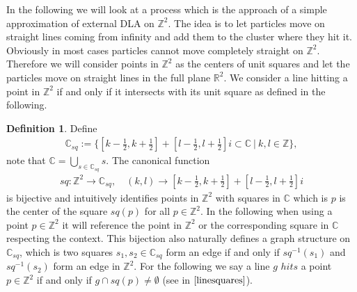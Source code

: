 \documentclass[12pt,a4paper]{scrartcl}
\numberwithin{equation}{subsection}
\newcommand{\C}{\mathbb{C}} %
\newcommand{\1}{\mathbbm{1}}
\numberwithin{equation}{section}
\theoremstyle{definition}
\newtheorem{definition}{Definition}[subsection]
\begin{document}
In the following we will look at a process which is the approach of a simple approximation of external DLA on $\mathbb{Z}^2$. The idea is to let particles move on straight lines coming from infinity and add them to the cluster where they hit it. Obviously in most cases particles cannot move completely straight on $\mathbb{Z}^2$. Therefore we will consider points in $\mathbb{Z}^2$ as the centers of unit squares and let the particles move on straight lines in the full plane $\mathbb{R}^2$. We consider a line hitting a point in $\mathbb{Z}^2$ if and only if it intersects with its unit square as defined in the following. 

\begin{definition} \label{squares}
	Define 
	\begin{align}
		\C_{sq} := \{[k - \frac{1}{2}, k + \frac{1}{2}] + [l- \frac{1}{2}, l + \frac{1}{2}]i \subset \C\ |\ k,l \in \mathbb{Z}\}, 
	\end{align} 
	note that $\C = \bigcup_{s\in \C_{sq}} s$. The canonical function
	\begin{align}
	sq: \mathbb{Z}^2 \to \C_{sq},\quad (k,l)\to [k - \frac{1}{2}, k + \frac{1}{2}] + [l- \frac{1}{2}, l + \frac{1}{2}]i
	\end{align}
	is bijective and intuitively identifies points in $\mathbb{Z}^2$ with squares in $\C$ which is $p$ is the center of the square $sq(p)$ for all $p\in \mathbb{Z}^2$. In the following when using a point $p\in \mathbb{Z}^2$ it will reference the point in $\mathbb{Z}^2$ or the corresponding square in $\C$ respecting the context. This bijection also naturally defines a graph structure on $\C_{sq}$, which is two squares $s_1, s_2\in \C_{sq}$ form an edge if and only if $sq^{-1}(s_1)$ and $sq^{-1}(s_2)$ form an edge in $\mathbb{Z}^2$. 
	\noindent For the following we say a line $g$ $hits$ a point $p\in \mathbb{Z}^2$ if and only if $g\cap sq(p) \neq \emptyset$ (see in $\autoref{linesquares}$). 
	
\end{definition}
\end{document}
